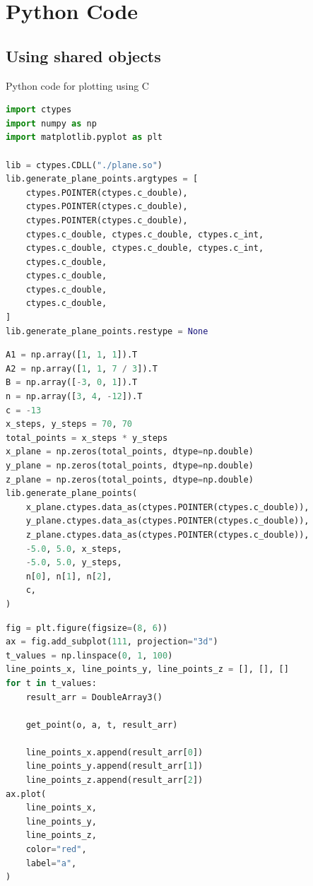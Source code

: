\documentclass{beamer}
\theoremstyle{remark}
\numberwithin{equation}{section}
\begin{document}
\section{Python Code}
\subsection{Using shared objects}
\begin{frame}[fragile]{Python code for plotting using C}
\begin{lstlisting}[language=Python]
import ctypes
import numpy as np
import matplotlib.pyplot as plt

lib = ctypes.CDLL("./plane.so")
lib.generate_plane_points.argtypes = [
    ctypes.POINTER(ctypes.c_double),
    ctypes.POINTER(ctypes.c_double),
    ctypes.POINTER(ctypes.c_double),
    ctypes.c_double, ctypes.c_double, ctypes.c_int,
    ctypes.c_double, ctypes.c_double, ctypes.c_int,
    ctypes.c_double,
    ctypes.c_double,
    ctypes.c_double,
    ctypes.c_double,
]
lib.generate_plane_points.restype = None
\end{lstlisting}
\end{frame}
\begin{frame}[fragile]
 \begin{lstlisting}[language=Python]
A1 = np.array([1, 1, 1]).T
A2 = np.array([1, 1, 7 / 3]).T
B = np.array([-3, 0, 1]).T
n = np.array([3, 4, -12]).T
c = -13
x_steps, y_steps = 70, 70
total_points = x_steps * y_steps
x_plane = np.zeros(total_points, dtype=np.double)
y_plane = np.zeros(total_points, dtype=np.double)
z_plane = np.zeros(total_points, dtype=np.double)
lib.generate_plane_points(
    x_plane.ctypes.data_as(ctypes.POINTER(ctypes.c_double)),
    y_plane.ctypes.data_as(ctypes.POINTER(ctypes.c_double)),
    z_plane.ctypes.data_as(ctypes.POINTER(ctypes.c_double)),
    -5.0, 5.0, x_steps,
    -5.0, 5.0, y_steps,
    n[0], n[1], n[2],
    c,
)
 \end{lstlisting}
\end{frame}
\begin{frame}[fragile]
 \begin{lstlisting}[language=Python]
fig = plt.figure(figsize=(8, 6))
ax = fig.add_subplot(111, projection="3d")
t_values = np.linspace(0, 1, 100)
line_points_x, line_points_y, line_points_z = [], [], []
for t in t_values:
    result_arr = DoubleArray3()

    get_point(o, a, t, result_arr)

    line_points_x.append(result_arr[0])
    line_points_y.append(result_arr[1])
    line_points_z.append(result_arr[2])
ax.plot(
    line_points_x,
    line_points_y,
    line_points_z,
    color="red",
    label="a",
)
 \end{lstlisting}
\end{frame}
\end{document}

